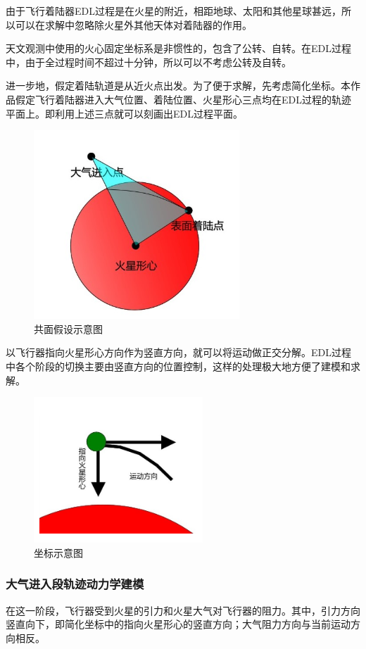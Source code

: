 \documentclass[UTF8,12pt]{ctexart}
\begin{document}
由于飞行着陆器EDL过程是在火星的附近，相距地球、太阳和其他星球甚远，所以可以在求解中忽略除火星外其他天体对着陆器的作用。

天文观测中使用的火心固定坐标系是非惯性的，包含了公转、自转。在EDL过程中，由于全过程时间不超过十分钟，所以可以不考虑公转及自转。 

进一步地，假定着陆轨道是从近火点出发。为了便于求解，先考虑简化坐标。本作品假定飞行着陆器进入大气位置、着陆位置、火星形心三点均在EDL过程的轨迹平面上。即利用上述三点就可以刻画出EDL过程平面。

\begin{figure}[htb]
	\centering
	\includegraphics[width=0.4\linewidth]{EDL.png}
	\caption{共面假设示意图}
	\label{fig:pathdemo}	
\end{figure}
以飞行器指向火星形心方向作为竖直方向，就可以将运动做正交分解。EDL过程中各个阶段的切换主要由竖直方向的位置控制，这样的处理极大地方便了建模和求解。

\begin{figure}[htb]
	\centering
	\includegraphics[width=0.5\linewidth]{坐标示意.png}
	\caption{坐标示意图}
	\label{fig:pathdemo}	
\end{figure}

\subsubsection{大气进入段轨迹动力学建模}

在这一阶段，飞行器受到火星的引力和火星大气对飞行器的阻力。其中，引力方向竖直向下，即简化坐标中的指向火星形心的竖直方向；大气阻力方向与当前运动方向相反。
\end{document}
